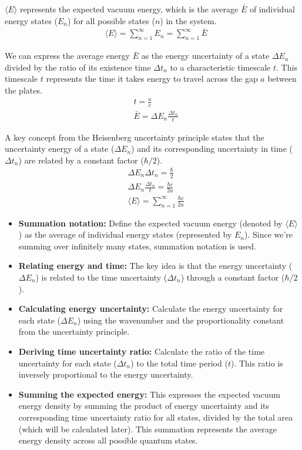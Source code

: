 \documentclass[aip,apl,amsmath,amssymb,reprint]{revtex4-2}
\begin{document}
$\langle E \rangle$ represents the expected vacuum energy, 
which is the average $\bar E$ of individual energy states ($E_n$) for all possible states ($n$) in the system.
\begin{align}
    &\langle E \rangle = \sum_{n=1}^{\infty}E_n = \sum_{n=1}^{\infty}\bar{E}
\end{align}

We can express the average energy $\bar E$ as the energy uncertainty of 
a state $\Delta E_n$ divided by the ratio of its existence time $\Delta t_n$ 
to a characteristic timescale $t$.
This timescale $t$ represents the time it takes energy to travel across the gap $a$ between the plates.
\begin{align}
    &t = \frac{a}{c} \\
    &\bar{E} = \Delta E_n\frac{\Delta t_n}{t}
\end{align}

A key concept from the Heisenberg uncertainty principle states that 
the uncertainty energy of a state ($\Delta E_n$) and its corresponding uncertainty in time ($\Delta t_n$) are 
related by a constant factor ($\hbar/2$).
\begin{align}
    &\Delta E_n \Delta t_n = \frac{\hbar}{2}\\
    &\Delta E_n \frac{\Delta t_n}{t} = \frac{\hbar c }{2 a}\\
    &\langle E \rangle = \sum_{n=1}^{\infty} \frac{\hbar c }{2 a}
\end{align}
\begin{itemize}
    \item \textbf{Summation notation:} Define the expected vacuum energy (denoted by $\langle E \rangle$ ) 
    as the average of individual energy states (represented by $E_n$). 
    Since we're summing over infinitely many states, summation notation is used.
    \item \textbf{Relating energy and time:} The key idea is that the energy uncertainty ($\Delta E_n$) is related 
    to the time uncertainty ($\Delta t_n$) through a constant factor ($\hbar/2$).
    \item \textbf{Calculating energy uncertainty:} Calculate the energy uncertainty for each state ($\Delta E_n$)
     using the wavenumber and the proportionality constant from the uncertainty principle.
    \item \textbf{Deriving time uncertainty ratio:} Calculate the ratio of the time uncertainty for each state ($\Delta t_n$)
     to the total time period ($t$). This ratio is inversely proportional to the energy uncertainty.
    \item \textbf{Summing the expected energy:} This expresses the expected vacuum energy density by summing 
    the product of energy uncertainty and its corresponding time uncertainty ratio for all states, 
    divided by the total area (which will be calculated later). 
    This summation represents the average energy density across all possible quantum states.
\end{itemize}
\end{document}
